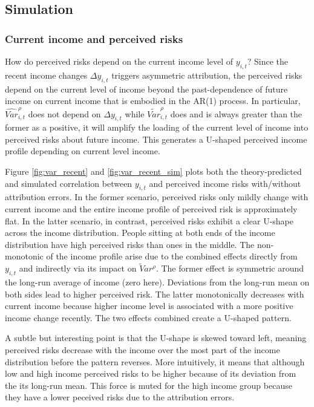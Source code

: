 \documentclass[12pt,notitlepage,onecolumn,aps,pra]{article}
\begin{document}
    \hypertarget{simulation}{%
\subsection{Simulation}\label{simulation}}

\hypertarget{current-income-and-perceived-risks}{%
\subsubsection{Current income and perceived
risks}\label{current-income-and-perceived-risks}}

How do perceived risks depend on the current income level of
\(y_{i,t}\)? Since the recent income changes \(\Delta y_{i,t}\) triggers
asymmetric attribution, the perceived risks depend on the current level
of income beyond the past-dependence of future income on current income
that is embodied in the AR(1) process. In particular,
\(\widehat{Var}^\rho_{i,t}\) does not depend on \(\Delta y_{i,t}\) while
\(\tilde{Var}^\rho_{i,t}\) does and is always greater than the former as
a positive, it will amplify the loading of the current level of income
into perceived risks about future income. This generates a U-shaped
perceived income profile depending on current level income.

Figure \ref{fig:var_recent} and \ref{fig:var_recent_sim} plots both the
theory-predicted and simulated correlation between \(y_{i,t}\) and
perceived income risks with/without attribution errors. In the former
scenario, perceived risks only mildly change with current income and the
entire income profile of perceived risk is approximately flat. In the
latter scenario, in contrast, perceived risks exhibit a clear U-shape
across the income distribution. People sitting at both ends of the
income distribution have high perceived risks than ones in the middle.
The non-monotonic of the income profile arise due to the combined
effects directly from \(y_{i,t}\) and indirectly via its impact on
\(\tilde Var^{\rho}\). The former effect is symmetric around the
long-run average of income (zero here). Deviations from the long-run
mean on both sides lead to higher perceived risk. The latter
monotonically decreases with current income because higher income level
is associated with a more positive income change recently. The two
effects combined create a U-shaped pattern.

A subtle but interesting point is that the U-shape is skewed toward
left, meaning perceived risks decrease with the income over the most
part of the income distribution before the pattern reverses. More
intuitively, it means that although low and high income perceived risks
to be higher because of its deviation from the its long-run mean. This
force is muted for the high income group because they have a lower
peceived risks due to the attribution errors.
\end{document}
